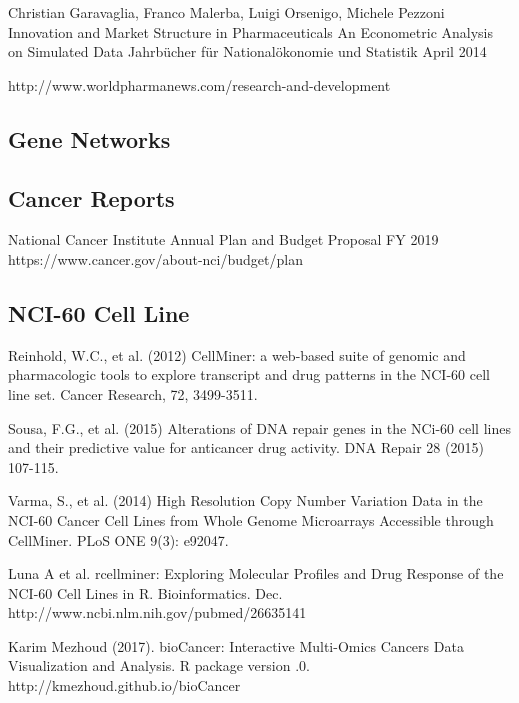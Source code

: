  Christian Garavaglia, Franco Malerba, Luigi Orsenigo, Michele Pezzoni
\newblock Innovation and Market Structure in Pharmaceuticals An Econometric Analysis on Simulated Data
\newblock Jahrbücher für Nationalökonomie und Statistik  April 2014

 http://www.worldpharmanews.com/research-and-development

\subsection{Gene Networks}
	
\subsection{Cancer Reports}
	
 National Cancer Institute
\newblock Annual Plan and Budget Proposal FY 2019
\newblock https://www.cancer.gov/about-nci/budget/plan 


\subsection{NCI-60 Cell Line}

Reinhold, W.C., et al. (2012) 
\newblock CellMiner: a web-based suite of genomic and pharmacologic tools to explore transcript and drug patterns in the NCI-60 cell line set. 
\newblock Cancer Research, 72, 3499-3511.

Sousa, F.G., et al. (2015) 
\newblock Alterations of DNA repair genes in the NCi-60 cell lines and their predictive value for anticancer drug activity. 
\newblock DNA Repair 28 (2015) 107-115.

Varma, S., et al. (2014) 
\newblock High Resolution Copy Number Variation Data in the NCI-60 Cancer Cell Lines from Whole Genome Microarrays Accessible through CellMiner. 
\newblock PLoS ONE 9(3): e92047.

 Luna A et al. rcellminer: Exploring Molecular Profiles and
\newblock Drug Response of the NCI-60 Cell Lines in R. Bioinformatics.
 Dec. http://www.ncbi.nlm.nih.gov/pubmed/26635141

Karim Mezhoud (2017). bioCancer: Interactive Multi-Omics
\newblock Cancers Data Visualization and Analysis. R package version
.0. http://kmezhoud.github.io/bioCancer

